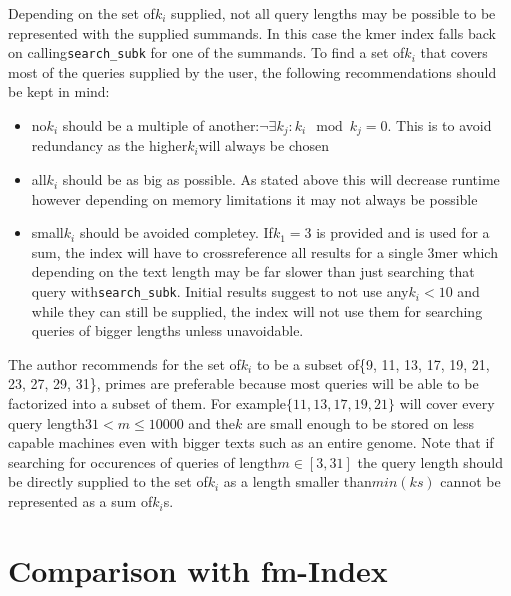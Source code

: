 Depending on the set of$k_{i}$ supplied, not all query lengths may
be possible to be represented with the supplied summands. In this
case the kmer index falls back on calling\lstinline{search_subk}
for one of the summands. To find a set of$k_{i}$ that covers most
of the queries supplied by the user, the following recommendations
should be kept in mind:
\begin{itemize}
\item no$k_{i}$ should be a multiple of another:$\lnot\exists k_{j}:k_{i}\mod k_{j}=0$.
This is to avoid redundancy as the higher$k_{i}$will always be chosen
\item all$k_{i}$ should be as big as possible. As stated above this will
decrease runtime however depending on memory limitations it may not
always be possible
\item small$k_{i}$ should be avoided completey. If$k_{1}=3$ is provided
and is used for a sum, the index will have to crossreference all results
for a single 3mer which depending on the text length may be far slower
than just searching that query with\lstinline{search_subk}. Initial
results suggest to not use any$k_{i}<10$ and while they can still
be supplied, the index will not use them for searching queries of
bigger lengths unless unavoidable.
\end{itemize}
The author recommends for the set of$k_{i}$ to be a subset of\{9,
11, 13, 17, 19, 21, 23, 27, 29, 31\}, primes are preferable because
most queries will be able to be factorized into a subset of them.
For example$\{11,13,17,19,21\}$ will cover every query length$31<m\leq10000$
and the$k$ are small enough to be stored on less capable machines
even with bigger texts such as an entire genome. Note that if searching
for occurences of queries of length$m\in[3,31]$ the query length
should be directly supplied to the set of$k_{i}$ as a length smaller
than$min(ks)$ cannot be represented as a sum of$k_{i}$s.

\section{Comparison with fm-Index}

